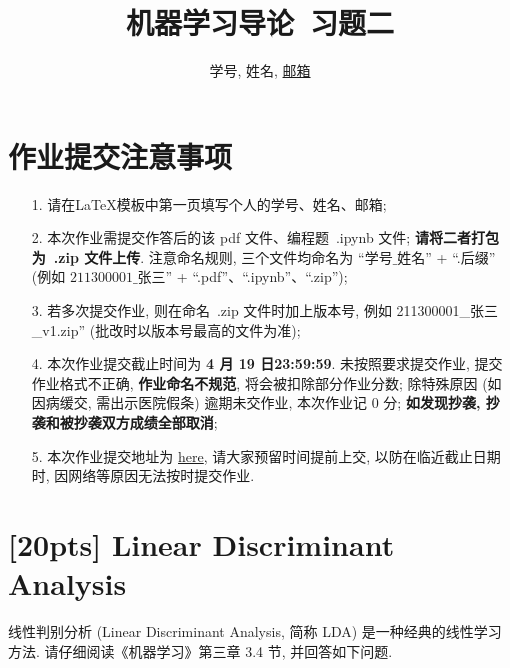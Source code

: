 \documentclass[a4paper,UTF8]{article}
\numberwithin{equation}{section}
\theoremstyle{definition}
\begin{document}
\title{机器学习导论\ 习题二}
\author{学号, 姓名, \href{mailto:邮箱}{邮箱}}
\maketitle
\section*{作业提交注意事项}
\begin{tcolorbox}
	\begin{enumerate}
		\item[1.] 请在LaTeX模板中第一页填写个人的学号、姓名、邮箱;
		\item[2.] 本次作业需提交作答后的该 pdf 文件、编程题~.ipynb 文件; {\color{red}\textbf{请将二者打包为~.zip 文件上传}}. 注意命名规则, 三个文件均命名为 “$\text{学号}\_\text{姓名}$” + “.后缀” (例如 $\text{211300001}\_\text{张三}$” + “.pdf”、“.ipynb”、“.zip”);
		\item[3.] 若多次提交作业, 则在命名~.zip 文件时加上版本号, 例如 211300001\_张三\_v1.zip” (批改时以版本号最高的文件为准);
		\item[4.] 本次作业提交截止时间为 {\color{red}\textbf{ 4 月 19 日23:59:59}}. 未按照要求提交作业, 提交作业格式不正确, {\color{red}\textbf{作业命名不规范}}, 将会被扣除部分作业分数; 除特殊原因 (如因病缓交, 需出示医院假条) 逾期未交作业, 本次作业记 0 分; {\color{red}\textbf{如发现抄袭, 抄袭和被抄袭双方成绩全部取消}};
		\item[5.] 本次作业提交地址为 \href{https://box.nju.edu.cn/u/d/72f6f8cfff054611b6d3/}{here}, 请大家预留时间提前上交, 以防在临近截止日期时, 因网络等原因无法按时提交作业.
	\end{enumerate}
\end{tcolorbox}
\newpage


\section{[20pts] Linear Discriminant Analysis}
线性判别分析 (Linear Discriminant Analysis, 简称 LDA) 是一种经典的线性学习方法. 请仔细阅读《机器学习》第三章 3.4 节, 并回答如下问题.
\end{document}

